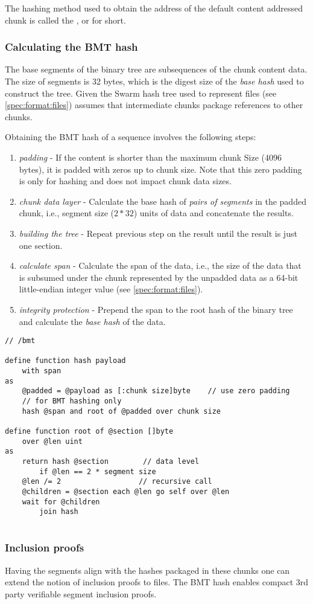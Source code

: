 The hashing method used to obtain the address of the default content addressed chunk is called the , or  for short. 

\subsubsection{Calculating the BMT hash}

The base segments of the binary tree are subsequences of the chunk content data. 
The size of segments is 32  bytes, which is the digest size of the \emph{base hash} used to construct the tree. 
Given the Swarm hash tree used to represent files (see \ref{spec:format:files}) assumes that intermediate chunks package references to other chunks. 

Obtaining the BMT hash of a sequence involves the following steps:

\begin{enumerate}
\item \emph{padding} - If the content is shorter than the maximum chunk Size  (4096 bytes), it is padded with zeros up to chunk size. Note that this zero padding is only for hashing and does not impact chunk data sizes.
\item \emph{chunk data layer} - Calculate the base hash of \emph{pairs of segments} in the padded chunk, i.e., segment size ($2 * 32$) units of data and concatenate the results.
\item \emph{building the tree} - Repeat previous step on the result until the result is just one section.
\item \emph{calculate span} - Calculate the span of the data, i.e., the size of the data that is subsumed under the chunk represented by the unpadded data as a 64-bit little-endian integer value (see  \ref{spec:format:files}).            
\item \emph{integrity protection} - Prepend the span to the root hash of the binary tree and calculate the \emph{base hash} of the data.
\end{enumerate}

\begin{definition}\label{def:bmt-hash}
\begin{lstlisting}[language=buzz1]
// /bmt

define function hash payload 
    with span
as
    @padded = @payload as [:chunk size]byte    // use zero padding 
    // for BMT hashing only
    hash @span and root of @padded over chunk size 
    
define function root of @section []byte
    over @len uint
as
    return hash @section        // data level
        if @len == 2 * segment size
    @len /= 2                  // recursive call
    @children = @section each @len go self over @len
    wait for @children 
        join hash
    

\end{lstlisting}
\end{definition}

\subsubsection{Inclusion proofs}

Having the segments align with the hashes packaged in these chunks one can extend the notion of inclusion proofs to files.
The BMT hash enables compact 3rd party verifiable segment inclusion proofs.

